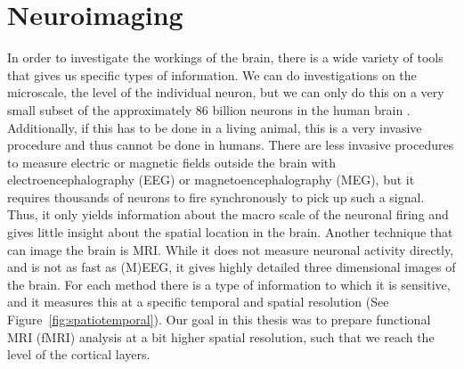 \section{Neuroimaging}
In order to investigate the workings of the brain, there is a wide variety of tools that gives us specific types of information. We can do investigations on the microscale, the level of the individual neuron, but we can only do this on a very small subset of the approximately 86 billion neurons in the human brain \cite{Herculano-Houzel2009}. Additionally, if this has to be done in a living animal, this is a very invasive procedure and thus cannot be done in humans. There are less invasive procedures to measure electric or magnetic fields outside the brain with electroencephalography (EEG) or magnetoencephalography (MEG), but it requires thousands of neurons to fire synchronously to pick up such a signal. Thus, it only yields information about the macro scale of the neuronal firing and gives little insight about the spatial location in the brain. Another technique that can image the brain is MRI. While it does not measure neuronal activity directly, and is not as fast as (M)EEG, it gives highly detailed three dimensional images of the brain. For each method there is a type of information to which it is sensitive, and it measures this at a specific temporal and spatial resolution (See Figure~\ref{fig:spatiotemporal}). Our goal in this thesis was to prepare functional MRI (fMRI) analysis at a bit higher spatial resolution, such that we reach the level of the cortical layers.


